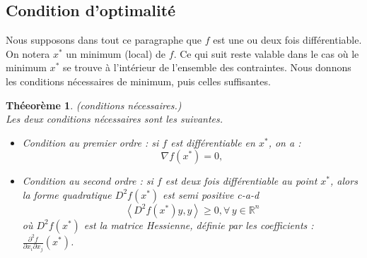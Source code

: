 \documentclass[12pt,a4paper,openay]{book}
\numberwithin{equation}{chapter}
\newtheorem{theo}{Th\'eeor\`eme}[chapter]
\newcommand{\R}{\mathbb{R}}
\let\oldforall\forall
\renewcommand{\forall}{\oldforall\,}
\begin{document}
	\subsection{Condition d'optimalit\'e}
	Nous supposons dans tout ce paragraphe que $f$ est une ou deux fois diff\'erentiable. On notera $x^*$ un minimum (local) de $f$.
	Ce qui suit reste valable dans le cas o\`u le minimum $x^*$ se trouve \`a l'int\'erieur de l'ensemble des contraintes.
	Nous donnons les conditions n\'ecessaires de minimum, puis celles suffisantes.
	
	\begin{theo}
		(conditions n\'ecessaires.)\\
		Les deux conditions n\'ecessaires sont les suivantes.
		\begin{itemize}
			\item[$\bullet$] Condition au premier ordre : si $f$ est diff\'erentiable en $x^*$, on a :
			$$
			\nabla f(x^*)=0,
			$$
			\item[$\bullet$] Condition au second ordre : si $f$ est deux fois diff\'erentiable au point $x^*$, alors la forme quadratique $D^2 f(x^*)$ est semi positive c-a-d
			$$
			\left\langle D^2 f(x^*) y, y\right\rangle \geq 0, \forall y \in \R^n
			$$	
			o\`u $D^2 f(x^*)$ est la matrice Hessienne, d\'efinie par les coefficients : $\frac{\partial^2 f}{\partial x_i \partial x_j}(x^*)$.
		\end{itemize}
	\end{theo}
	
\end{document}
